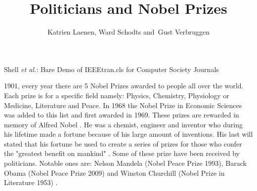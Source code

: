 \documentclass[11pt,journal,compsoc]{IEEEtran}
\begin{document}
%

\title{Politicians and Nobel Prizes}

\author{Katrien Laenen,
        Ward Schodts
        and~Gust Verbruggen\\ 
%

}

%
{Shell \MakeLowercase{\textit{et al.}}: Bare Demo of IEEEtran.cls for Computer Society Journals}






\maketitle

\IEEEdisplaynontitleabstractindextext

\IEEEpeerreviewmaketitle

 1901, every year there are 5 Nobel Prizes awarded to people all over the world. Each prize is for a specific field namely: Physics, Chemistry, Physiology or Medicine, Literature and Peace. In 1968 the Nobel Prize in Economic Sciences was added to this list and first awarded in 1969.
These prizes are rewarded in memory of Alfred Nobel \cite{nobelNobel}.
He was a chemist, engineer and inventor who during his lifetime made a fortune because of his large amount of inventions. His last will stated that his fortune be used to create a series of prizes for those who confer the "greatest benefit on mankind" \cite{wikiNobel}. 
Some of these prize have been received by politicians. Notable ones are: Nelson Mandela (Nobel Peace Prize 1993), Barack Obama (Nobel Peace Prize 2009) and Winston Churchill (Nobel Prize in Literature 1953) \cite{nobelList}.
\end{document}
